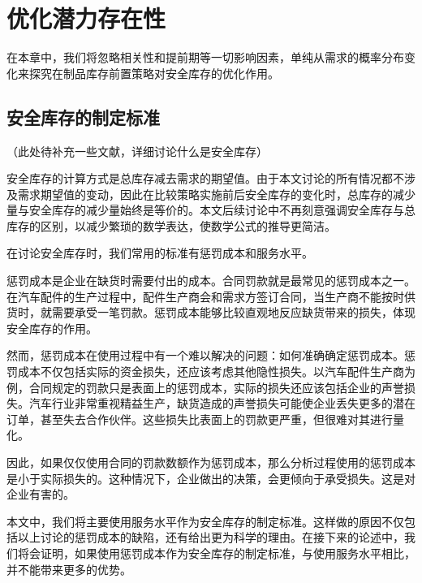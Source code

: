 
\chapter{优化潜力存在性}

在本章中，我们将忽略相关性和提前期等一切影响因素，单纯从需求的概率分布变化来探究在制品库存前置策略对安全库存的优化作用。






\section{安全库存的制定标准}

（此处待补充一些文献，详细讨论什么是安全库存）

安全库存的计算方式是总库存减去需求的期望值。由于本文讨论的所有情况都不涉及需求期望值的变动，因此在比较策略实施前后安全库存的变化时，总库存的减少量与安全库存的减少量始终是等价的。本文后续讨论中不再刻意强调安全库存与总库存的区别，以减少繁琐的数学表达，使数学公式的推导更简洁。

在讨论安全库存时，我们常用的标准有惩罚成本和服务水平。

惩罚成本是企业在缺货时需要付出的成本。合同罚款就是最常见的惩罚成本之一。在汽车配件的生产过程中，配件生产商会和需求方签订合同，当生产商不能按时供货时，就需要承受一笔罚款。惩罚成本能够比较直观地反应缺货带来的损失，体现安全库存的作用。

然而，惩罚成本在使用过程中有一个难以解决的问题：如何准确确定惩罚成本。惩罚成本不仅包括实际的资金损失，还应该考虑其他隐性损失。以汽车配件生产商为例，合同规定的罚款只是表面上的惩罚成本，实际的损失还应该包括企业的声誉损失。汽车行业非常重视精益生产，缺货造成的声誉损失可能使企业丢失更多的潜在订单，甚至失去合作伙伴。这些损失比表面上的罚款更严重，但很难对其进行量化。

因此，如果仅仅使用合同的罚款数额作为惩罚成本，那么分析过程使用的惩罚成本是小于实际损失的。这种情况下，企业做出的决策，会更倾向于承受损失。这是对企业有害的。

本文中，我们将主要使用服务水平作为安全库存的制定标准。这样做的原因不仅包括以上讨论的惩罚成本的缺陷，还有给出更为科学的理由。在接下来的论述中，我们将会证明，如果使用惩罚成本作为安全库存的制定标准，与使用服务水平相比，并不能带来更多的优势。

